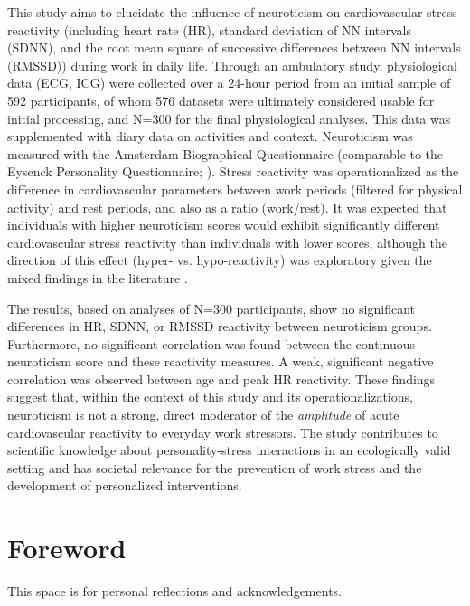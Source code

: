 \documentclass[11pt, a4paper]{report}
\begin{document}
This study aims to elucidate the influence of neuroticism on cardiovascular stress reactivity (including heart rate (HR), standard deviation of NN intervals (SDNN), and the root mean square of successive differences between NN intervals (RMSSD)) during work in daily life. Through an ambulatory study, physiological data (ECG, ICG) were collected over a 24-hour period from an initial sample of 592 participants, of whom 576 datasets were ultimately considered usable for initial processing, and N=300 for the final physiological analyses. This data was supplemented with diary data on activities and context. Neuroticism was measured with the Amsterdam Biographical Questionnaire (comparable to the Eysenck Personality Questionnaire; \cite{EysenckEysenck1975}). Stress reactivity was operationalized as the difference in cardiovascular parameters between work periods (filtered for physical activity) and rest periods, and also as a ratio (work/rest). It was expected that individuals with higher neuroticism scores would exhibit significantly different cardiovascular stress reactivity than individuals with lower scores, although the direction of this effect (hyper- vs. hypo-reactivity) was exploratory given the mixed findings in the literature \cite{ChidaHamer2008}.

The results, based on analyses of N=300 participants, show no significant differences in HR, SDNN, or RMSSD reactivity between neuroticism groups. Furthermore, no significant correlation was found between the continuous neuroticism score and these reactivity measures. A weak, significant negative correlation was observed between age and peak HR reactivity. These findings suggest that, within the context of this study and its operationalizations, neuroticism is not a strong, direct moderator of the \textit{amplitude} of acute cardiovascular reactivity to everyday work stressors. The study contributes to scientific knowledge about personality-stress interactions in an ecologically valid setting and has societal relevance for the prevention of work stress and the development of personalized interventions.

\chapter*{Foreword}
\vspace*{\fill} %

This space is for personal reflections and acknowledgements.
\end{document}
